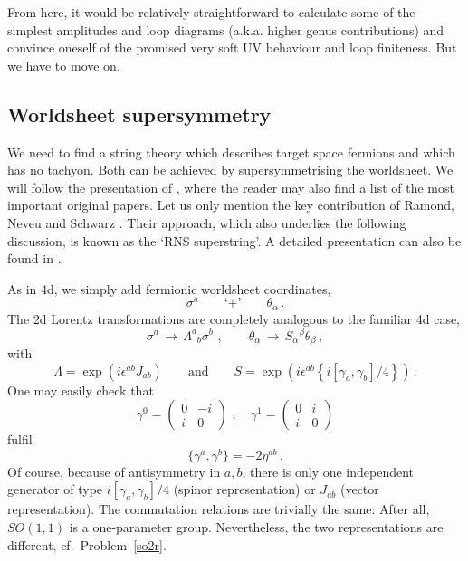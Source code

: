 \documentclass[12pt]{article}
\newcommand{\be}{\begin{equation}}
\newcommand{\ee}{\end{equation}}
\numberwithin{equation}{section}
\begin{document}
From here, it would be relatively straightforward to calculate some of the simplest amplitudes and loop diagrams (a.k.a. higher genus contributions) and convince oneself of the promised very soft UV behaviour and loop finiteness. But we have to move on. 






\subsection{Worldsheet supersymmetry}

We need to find a string theory which describes target space fermions and which has no tachyon. Both can be achieved by supersymmetrising the worldsheet. We will follow the presentation of \cite{Green:1987sp}, where the reader may also find a list of the most important original papers. Let us only mention the key contribution of Ramond, Neveu and Schwarz \cite{Ramond:1971gb, Neveu:1971rx}. Their approach, which also underlies the following discussion, is known as the  `RNS superstring'. A detailed presentation can also be found in \cite{Blumenhagen:2013fgp}.

As in 4d, we simply add fermionic worldsheet coordinates,
\be
\sigma^a\qquad \mbox{`+'} \qquad \theta_\alpha\,.
\ee
The 2d Lorentz transformations are completely analogous to the familiar 4d case, 
\be
\sigma^a\,\to\, \Lambda^a{}_b\sigma^b\,\,,\qquad \theta_\alpha\,\to\,
S_\alpha{}^\beta\theta_\beta\,,
\ee
with
\be
\Lambda=\exp(i\epsilon^{ab}J_{ab})\qquad\mbox{and}\qquad
S=\exp(i\epsilon^{ab}\left\{i[\gamma_a,\gamma_b]/4\right\})\,.
\ee
One may easily check that 
\be
\gamma^0=\left(\begin{array}{rr}0&-i\\i&0\end{array}\right)\,\,,\quad
\gamma^1=\left(\begin{array}{rr}0&i\\i&0\end{array}\right)
\ee
fulfil
\be
\{\gamma^a,\gamma^b\}=-2\eta^{ab}\,.
\ee
Of course, because of antisymmetry in $a,b$, there is only one independent generator of type $i[\gamma_a,\gamma_b]/4$ (spinor representation) or $J_{ab}$ (vector representation). The commutation relations are trivially the same: After all, $SO(1,1)$ is a one-parameter group. Nevertheless, the two representations are different, cf.~Problem~\ref{so2r}.
\end{document}
